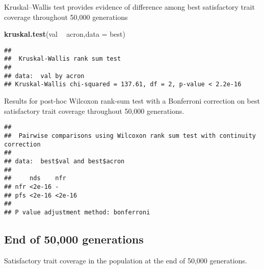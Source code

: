 \documentclass[]{book}
\newenvironment{Shaded}{\begin{snugshade}}{\end{snugshade}}
\newcommand{\DataTypeTok}[1]{\textcolor[rgb]{0.13,0.29,0.53}{#1}}
\newcommand{\KeywordTok}[1]{\textcolor[rgb]{0.13,0.29,0.53}{\textbf{#1}}}
\newcommand{\NormalTok}[1]{#1}
\newcommand{\OperatorTok}[1]{\textcolor[rgb]{0.81,0.36,0.00}{\textbf{#1}}}
\newcommand{\OtherTok}[1]{\textcolor[rgb]{0.56,0.35,0.01}{#1}}
\newcommand{\StringTok}[1]{\textcolor[rgb]{0.31,0.60,0.02}{#1}}
\begin{document}
Kruskal--Wallis test provides evidence of difference among best satisfactory trait coverage throughout 50,000 generations

\begin{Shaded}
\begin{Highlighting}[]
\KeywordTok{kruskal.test}\NormalTok{(val }\OperatorTok{~}\StringTok{ }\NormalTok{acron,}\DataTypeTok{data =}\NormalTok{ best)}
\end{Highlighting}
\end{Shaded}

\begin{verbatim}
## 
##  Kruskal-Wallis rank sum test
## 
## data:  val by acron
## Kruskal-Wallis chi-squared = 137.61, df = 2, p-value < 2.2e-16
\end{verbatim}

Results for post-hoc Wilcoxon rank-sum test with a Bonferroni correction on best satisfactory trait coverage throughout 50,000 generations.

\begin{Shaded}
\end{Shaded}

\begin{verbatim}
## 
##  Pairwise comparisons using Wilcoxon rank sum test with continuity correction 
## 
## data:  best$val and best$acron 
## 
##     nds    nfr   
## nfr <2e-16 -     
## pfs <2e-16 <2e-16
## 
## P value adjustment method: bonferroni
\end{verbatim}

\hypertarget{end-of-50000-generations-3}{%
\subsection{End of 50,000 generations}\label{end-of-50000-generations-3}}

Satisfactory trait coverage in the population at the end of 50,000 generations.
\end{document}
